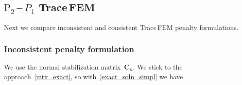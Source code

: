 \documentclass[12pt]{article}
\newcommand{\vect}[1]{\boldsymbol{\mathbf{#1}}}
\newcommand*\diff{\mathop{}\!\mathrm{d}}
\DeclareMathOperator{\Div}{div}
\begin{document}
\subsection{$\text{P}_2$\,--\,$P_1$ Trace\,FEM}

Next we compare inconsistent and consistent Trace\,FEM penalty formulations. 

\subsubsection{Inconsistent penalty formulation}

We use the normal stabilization matrix~$\vect C_n$. We stick to the approach~\eqref{mtx_exact}, so with~\eqref{exact_soln_simpl} we have
\end{document}
